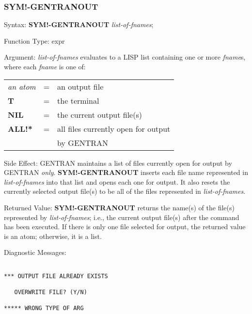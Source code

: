 \subsubsection{SYM!-GENTRANOUT} 
\begin{describe}{Syntax:}
{\bf SYM!-GENTRANOUT} {\it list-of-fnames\/};
\end{describe}
\begin{describe}{Function Type:}
expr
\end{describe}
\begin{describe}{Argument:}
{\it list-of-fnames\/} evaluates to a LISP list containing one or more
{\it fname\/}s, where each {\it fname} is one of:

\begin{tabular}{lll}
{\it an atom} & = & an output file\\
{\bf T} & = & the terminal\\
{\bf NIL} & = &  the current output file(s)\\
{\bf ALL!*} & = &  all files currently open for output \\
& &  by GENTRAN\\
\end{tabular}
\end{describe}
\begin{describe}{Side Effect:}
GENTRAN maintains a list of files currently open for output by GENTRAN
{\it only}.  {\bf SYM!-GENTRANOUT} inserts each file name represented in
{\it list-of-fnames\/} into that list and opens each one
for output.  It also resets the currently selected output file(s) to be
all of the files represented in {\it list-of-fnames}.
\end{describe}
\begin{describe}{Returned Value:}
{\bf SYM!-GENTRANOUT} returns the name(s) of the file(s) represented
by {\it list-of-fnames\/}; i.e., the current output file(s) after the
command has been executed.  If there is only one file
selected for output, the returned value is an atom; otherwise, it is
a list.
\end{describe}
\begin{describe}{Diagnostic Messages:}
\begin{verbatim}

*** OUTPUT FILE ALREADY EXISTS

   OVERWRITE FILE? (Y/N)

***** WRONG TYPE OF ARG
\end{verbatim}
\end{describe}

